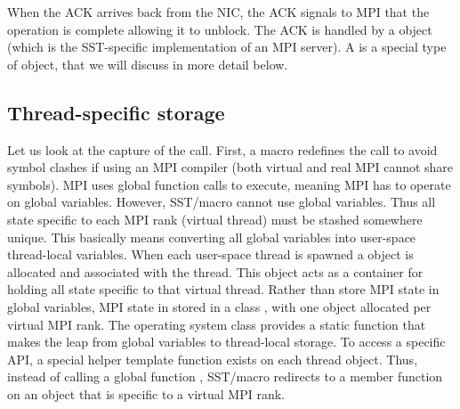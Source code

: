 When the ACK arrives back from the NIC, the ACK signals to MPI that the operation is complete allowing it to unblock.
The ACK is handled by a  object (which is the SST-specific implementation of an MPI server). 
A  is a special type of object, that we will discuss in more detail below.

\subsection{Thread-specific storage}
\label{subsec:threadStorage}
Let us look at the capture of the  call. 
First, a macro redefines the call to avoid symbol clashes if using an MPI compiler (both virtual and real MPI cannot share symbols).
MPI uses global function calls to execute, meaning MPI has to operate on global variables.
However, SST/macro cannot use global variables.
Thus all state specific to each MPI rank (virtual thread) must be stashed somewhere unique.
This basically means converting all global variables into user-space thread-local variables.
When each user-space thread is spawned a  object is allocated and associated with the thread.
This object acts as a container for holding all state specific to that virtual thread.
Rather than store MPI state in global variables, MPI state in stored in a class , 
with one  object allocated per virtual MPI rank.
The operating system class provides a static function  that makes the leap from
global variables to thread-local storage.
To access a specific API, a special helper template function  exists on each thread object.
Thus, instead of calling a global function ,
SST/macro redirects to a member function  on an  object that is specific to a virtual MPI rank.

